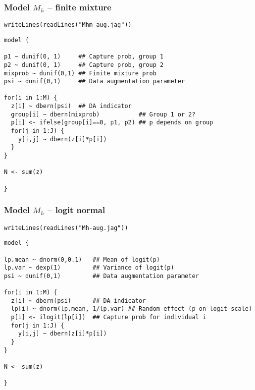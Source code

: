 \documentclass[color=usenames,dvipsnames]{beamer}\usepackage[]{graphicx}\usepackage[]{xcolor}
\makeatletter
\newcommand{\hlstr}[1]{\textcolor[rgb]{0.749,0.012,0.012}{#1}}%
\newcommand{\hlstd}[1]{\textcolor[rgb]{0,0,0}{#1}}%
\newcommand{\hlkwd}[1]{\textcolor[rgb]{0.004,0.004,0.506}{#1}}%
\newenvironment{kframe}{%
 \def\at@end@of@kframe{}%
 \ifinner\ifhmode%
  \def\at@end@of@kframe{\end{minipage}}%
  \begin{minipage}{\columnwidth}%
 \fi\fi%
 \def\FrameCommand##1{\hskip\@totalleftmargin \hskip-\fboxsep
 \colorbox{shadecolor}{##1}\hskip-\fboxsep
     \hskip-\linewidth \hskip-\@totalleftmargin \hskip\columnwidth}%
 \MakeFramed {\advance\hsize-\width
   \@totalleftmargin\z@ \linewidth\hsize
   \@setminipage}}%
 {\par\unskip\endMakeFramed%
 \at@end@of@kframe}
\newenvironment{knitrout}{}{} %
\makeatother
\begin{document}
\begin{frame}[fragile]
  \frametitle{Model $M_h$ -- finite mixture}
\vspace{-3pt}
\begin{knitrout}\footnotesize
{}\color{fgcolor}\begin{kframe}
\begin{alltt}
\hlkwd{writeLines}\hlstd{(}\hlkwd{readLines}\hlstd{(}\hlstr{"Mhm-aug.jag"}\hlstd{))}
\end{alltt}
\begin{verbatim}
model {

p1 ~ dunif(0, 1)     ## Capture prob, group 1
p2 ~ dunif(0, 1)     ## Capture prob, group 2
mixprob ~ dunif(0,1) ## Finite mixture prob
psi ~ dunif(0,1)     ## Data augmentation parameter

for(i in 1:M) {     
  z[i] ~ dbern(psi)  ## DA indicator
  group[i] ~ dbern(mixprob)           ## Group 1 or 2?
  p[i] <- ifelse(group[i]==0, p1, p2) ## p depends on group
  for(j in 1:J) {
    y[i,j] ~ dbern(z[i]*p[i])
  }
}

N <- sum(z)

}
\end{verbatim}
\end{kframe}
\end{knitrout}
\end{frame}



\begin{frame}[fragile]
  \frametitle{Model $M_h$ -- logit normal}
\vspace{-3pt}
\begin{knitrout}\footnotesize
{}\color{fgcolor}\begin{kframe}
\begin{alltt}
\hlkwd{writeLines}\hlstd{(}\hlkwd{readLines}\hlstd{(}\hlstr{"Mh-aug.jag"}\hlstd{))}
\end{alltt}
\begin{verbatim}
model {

lp.mean ~ dnorm(0,0.1)   ## Mean of logit(p)
lp.var ~ dexp(1)         ## Variance of logit(p)
psi ~ dunif(0,1)         ## Data augmentation parameter

for(i in 1:M) {     
  z[i] ~ dbern(psi)      ## DA indicator
  lp[i] ~ dnorm(lp.mean, 1/lp.var) ## Random effect (p on logit scale)
  p[i] <- ilogit(lp[i])  ## Capture prob for individual i
  for(j in 1:J) {
    y[i,j] ~ dbern(z[i]*p[i])
  }
}

N <- sum(z)

}
\end{verbatim}
\end{kframe}
\end{knitrout}
\end{frame}
\end{document}
